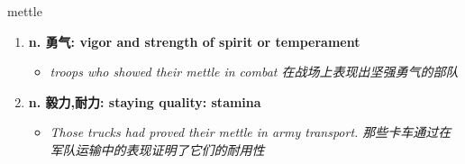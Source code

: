 
\begin{frame}
{\huge mettle}
\begin{center}
\begin{enumerate}\Large
  \item \textbf{n. 勇气: vigor and strength of spirit or temperament}
  \begin{itemize}
    \item \em{\Large{troops who showed their mettle in combat 在战场上表现出坚强勇气的部队}}
  \end{itemize}
  \item \textbf{n. 毅力,耐力: staying quality: stamina}
  \begin{itemize}
    \item \em{\Large{Those trucks had proved their mettle in army transport. 那些卡车通过在军队运输中的表现证明了它们的耐用性}}
  \end{itemize}
\end{enumerate}
\end{center}
\end{frame}
